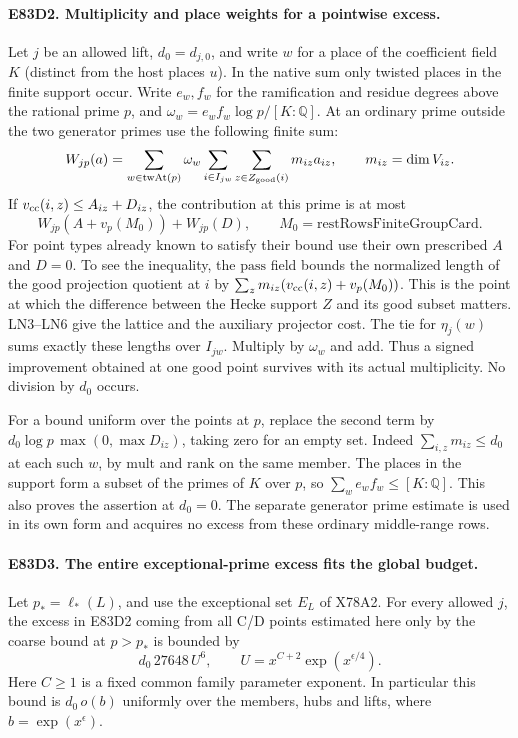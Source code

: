 \paragraph{E83D2. Multiplicity and place weights for a pointwise excess.}
Let $j$ be an allowed lift, $d_0=d_{j,0}$, and write $w$ for a
place of the coefficient field $K$ (distinct from the host
places $u$). In the native sum only twisted places in the finite
support occur. Write $e_w,f_w$ for the ramification and residue
degrees above the rational prime $p$, and
$\omega_w=e_w f_w\log p/[K:\mathbb Q]$. At an ordinary prime
outside the two generator primes use the following finite sum:
\[
 W_{jp}(a)=\sum_{w\in\mathrm{twAt}(p)}\omega_w
 \sum_{i\in I_{jw}}\sum_{z\in Z_{\rm good}(i)}m_{iz}a_{iz},
 \qquad m_{iz}=\dim V_{iz}.
\]
If $v_{\rm cc}(i,z)\le A_{iz}+D_{iz}$, the contribution at this
prime is at most
\[
       W_{jp}(A+v_p(M_0))+W_{jp}(D),\qquad
       M_0=\mathrm{restRowsFiniteGroupCard}.
\]
For point types already known to satisfy their bound use their
own prescribed $A$ and $D=0$. To see the inequality, the
$\mathrm{pass}$ field bounds the normalized length of the
good projection quotient at $i$ by
$\sum_z m_{iz}(v_{\rm cc}(i,z)+v_p(M_0))$. This is the
point at which the difference between the Hecke support $Z$
and its good subset matters. LN3--LN6 give the lattice and the
auxiliary projector cost. The tie for $\eta_j(w)$ sums exactly
these lengths over $I_{jw}$. Multiply by $\omega_w$ and add.
Thus a signed improvement obtained at one good point survives
with its actual multiplicity. No division by $d_0$ occurs.

For a bound uniform over the points at $p$, replace the
second term by $d_0\log p\,\max(0,\max D_{iz})$, taking zero
for an empty set. Indeed $\sum_{i,z}m_{iz}\le d_0$ at each
such $w$, by $\mathrm{mult}$ and $\mathrm{rank}$ on the same
member. The places in the support form a subset of the primes
of $K$ over $p$, so $\sum_w e_wf_w\le[K:\mathbb Q]$. This
also proves the assertion at $d_0=0$. The separate generator
prime estimate is used in its own form and acquires no excess
from these ordinary middle-range rows.

\paragraph{E83D3. The entire exceptional-prime excess fits the global budget.}
Let $p_*=\ell_*(L)$, and use the exceptional set $E_L$ of X78A2.
For every allowed $j$, the excess in E83D2 coming from all
C/D points estimated here only by the coarse bound at $p>p_*$ is bounded by
\[
       d_0\,27648\,U^6,\qquad
       U=x^{C+2}\exp(x^{\epsilon/4}).
\]
Here $C\ge1$ is a fixed common family parameter exponent.
In particular this bound is $d_0\,o(b)$ uniformly over the
members, hubs and lifts, where $b=\exp(x^\epsilon)$.

